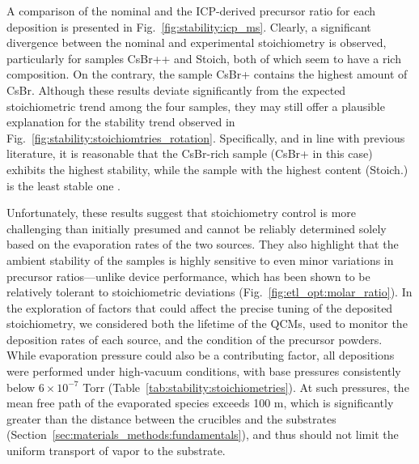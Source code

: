 A comparison of the nominal and the ICP-derived precursor ratio for each deposition is presented in Fig.~\ref{fig:stability:icp_ms}. Clearly, a significant divergence between the nominal and experimental stoichiometry is observed, particularly for samples CsBr++ and Stoich, both of which seem to have a  rich composition. On the contrary, the sample CsBr+ contains the highest amount of CsBr. Although these results deviate significantly from the expected stoichiometric trend among the four samples, they may still offer a plausible explanation for the stability trend observed in Fig.~\ref{fig:stability:stoichiomtries_rotation}. Specifically, and in line with previous literature, it is reasonable that the CsBr-rich sample (CsBr+ in this case) exhibits the highest stability, while the sample with the highest  content (Stoich.) is the least stable one \cite{Ma2017TheCells}.

Unfortunately, these results suggest that stoichiometry control is more challenging than initially presumed and cannot be reliably determined solely based on the evaporation rates of the two sources. They also highlight that the ambient stability of the samples is highly sensitive to even minor variations in precursor ratios—unlike device performance, which has been shown to be relatively tolerant to stoichiometric deviations (Fig.~\ref{fig:etl_opt:molar_ratio}). In the exploration of factors that could affect the precise tuning of the deposited stoichiometry, we considered both the lifetime of the QCMs, used to monitor the deposition rates of each source, and the condition of the precursor powders. While evaporation pressure could also be a contributing factor, all depositions were performed under high-vacuum conditions, with base pressures consistently below $6 \times 10^{-7}$ Torr (Table~\ref{tab:stability:stoichiometries}). At such pressures, the mean free path of the evaporated species exceeds 100 m, which is significantly greater than the distance between the crucibles and the substrates (Section~\ref{sec:materials_methods:fundamentals}), and thus should not limit the uniform transport of vapor to the substrate.

